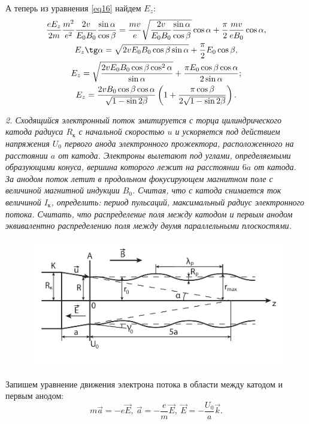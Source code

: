     А теперь из уравнения \eqref{eq16} найдем \( E_z \):
    \begin{gather*}
        \frac{eE_z}{2m}\frac{m^2}{e^2}\frac{2v}{E_0B_0}\frac{\sin\alpha}
        {\cos\beta} = \frac{mv}{e}\sqrt{\frac{2v}{E_0B_0}\frac{\sin\alpha}
        {\cos\beta}}\cos\alpha + \frac{\pi}{2}\frac{mv}{eB_0}\cos\alpha, \\
        E_z\tg\alpha = \sqrt{2vE_0B_0\cos\beta\sin\alpha} + \frac{\pi}{2}E_0
        \cos\beta,\\
        E_z = \sqrt{\frac{2vE_0B_0\cos\beta\cos^2\alpha}
        {\sin\alpha}} + \frac{\pi E_0\cos\beta\cos\alpha}{2\sin\alpha}; \\
        E_z = \frac{2vB_0\cos\beta\cos\alpha}{\sqrt{1 - \sin2\beta}}\left(
        1 + \frac{\pi\cos\beta}{2\sqrt{1 - \sin2\beta}}\right).
    \end{gather*}
    
    \newpage
    \emph{2. Сходящийся электронный поток эмитируется с торца цилиндрического
    катода радиуса \( R_\text{к} \) с начальной скоростью \( u \) и ускоряется
    под действием напряжения \( U_0 \) первого анода электронного прожектора,
    расположенного на расстоянии \( a \) от катода. Электроны вылетают под
    углами, определяемыми образующими конуса, вершина которого лежит на
    расстоянии \( 6a \) от катода. За анодом поток летит в продольном
    фокусирующем магнитном поле с величиной магнитной индукции \( B_0 \).
    Считая, что с катода снимается ток величиной \( I_\text{к} \), определить:
    период пульсаций, максимальный радиус электронного потока. Считать, что
    распределение поля между катодом и первым анодом эквивалентно распределению
    поля между двумя параллельными плоскостями.}
    \begin{figure}[h!]
        \center
        \includegraphics[width=.7\textwidth]{ch2}
    \end{figure}
    
    Запишем уравнение движения электрона потока в области между катодом и
    первым анодом:
    \[
        m\vec{a} = -e\vec{E},\ \vec{a} = -\frac{e}{m}\vec{E},\ 
        \vec{E} = -\frac{U_0}{a}\vec{k}.
    \]
    
